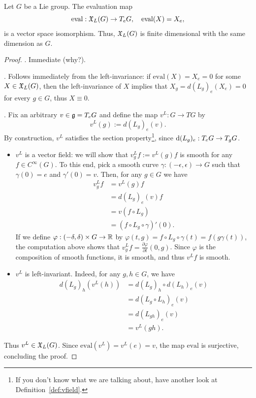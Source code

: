 \begin{theorem}\label{thm:evaliso}
	Let $G$ be a Lie group. The evaluation map
	\begin{equation}
		\mathrm{eval}:\mathfrak{X}_L(G)\to T_eG, \quad
		\mathrm{eval}(X) = X_e,
	\end{equation}
	is a vector space isomorphism.
	Thus, $\mathfrak{X}_L(G)$ is finite dimensional with the same dimension as $G$.
\end{theorem}
\begin{proof}
	. Immediate (why?).

	. Follows immediately from the left-invariance: if $\mathrm{eval}(X) = X_e = 0$ for some $X\in\mathfrak{X}_L(G)$, then the left-invariance of $X$ implies that $X_g = d(L_g)_e(X_e) = 0$ for every $g\in G$, thus $X\equiv0$.

	.
	Fix an arbitrary $v\in \mathfrak{g} = T_eG$ and define the map $v^L:G\to TG$ by
	\begin{equation}
		v^L(g) := d(L_g)_e(v).
	\end{equation}
	By construction, $v^L$ satisfies the section property\footnote{If you don't know what we are talking about, have another look at Definition~\ref{def:vfield}.}, since $\operatorname{d}(L_g)_e:T_eG\to T_gG$.
	\begin{itemize}
		\item $v^L$ is a vector field: we will show that $v^L_g f := v^L(g) f$ is smooth for any $f\in C^\infty(G)$.
		      To this end, pick a smooth curve $\gamma:(-\epsilon,\epsilon)\to G$ such that $\gamma(0)=e$ and $\gamma'(0) = v$. Then, for any $g\in G$ we have
		      \begin{align}
			      v^L_g f & = v^L(g) f                      \\
			              & = d(L_g)_e(v) f                 \\
			              & = v(f\circ L_g)                 \\
			              & = (f\circ L_g\circ \gamma)'(0).
		      \end{align}
		      If we define $\varphi:(-\delta, \delta)\times G \to \mathbb{R}$ by $\varphi(t,g) = f\circ L_g\circ \gamma(t) = f(g\gamma(t))$, the computation above shows that $v^L_gf = \frac{\partial \varphi}{\partial t}(0, g)$.
		      Since $\varphi$ is the composition of smooth functions, it is smooth, and thus $v^L f$ is smooth.
		\item $v^L$ is left-invariant.
		      Indeed, for any $g,h\in G$, we have
		      \begin{align}
			      d(L_g)_h(v^L(h)) & = d(L_g)_h\circ d(L_h)_e(v) \\
			                       & = d(L_g\circ L_h)_e(v)      \\
			                       & = d(L_{gh})_e(v)            \\
			                       & = v^L(gh).
		      \end{align}
	\end{itemize}
	Thus $v^L\in\mathfrak{X}_L(G)$.
	Since $\mathrm{eval}(v^L) = v^L(e) = v$, the map $\mathrm{eval}$ is surjective, concluding the proof.
\end{proof}

